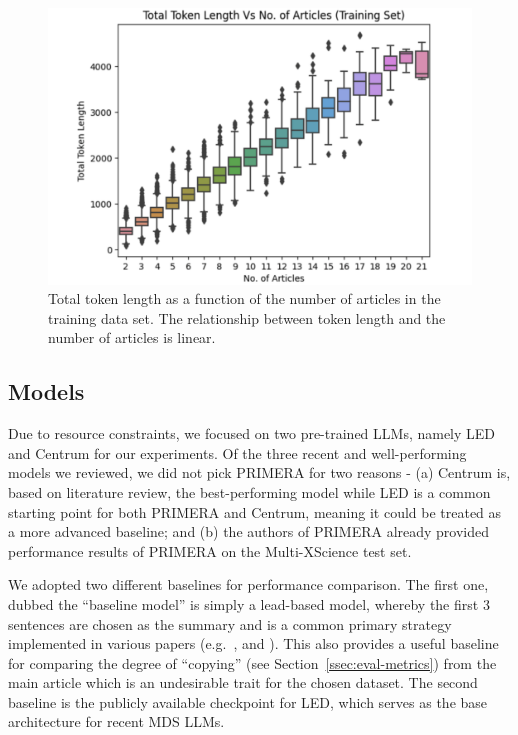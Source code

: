 \documentclass[12pt, twocolumn]{article}
\numberwithin{equation}{section}
\begin{document}
\begin{figure}
    \captionsetup{width=\columnwidth}
    \includegraphics[width=\columnwidth]{token_length.png}
    \caption{Total token length as a function of the number of articles in the training data set. The relationship between token length and the number of articles is linear.}
    \label{fig:token-length}
\end{figure}

\subsection{Models}
\label{ssec:models}

Due to resource constraints, we focused on two pre-trained LLMs, namely LED and Centrum for our experiments.  Of the three recent and well-performing models we reviewed, we did not pick PRIMERA for two reasons - (a) Centrum is, based on literature review, the best-performing model while LED is a common starting point for both PRIMERA and Centrum, meaning it could be treated as a more advanced baseline; and (b) the authors of PRIMERA already provided performance results of PRIMERA on the Multi-XScience test set. 

We adopted two different baselines for performance comparison.  The first one, dubbed the ``baseline model'' is simply a lead-based model, whereby the first 3 sentences are chosen as the summary and is a common primary strategy implemented in various papers (e.g.~\cite{lu-etal-2020-multi-xscience}, \cite{see2017point} and \cite{zhang2020pegasus}).  This also provides a useful baseline for comparing the degree of ``copying'' (see Section~\ref{ssec:eval-metrics}) from the main article which is an undesirable trait for the chosen dataset.  The second baseline is the publicly available checkpoint for LED, which serves as the base architecture for recent MDS LLMs.  
\end{document}
